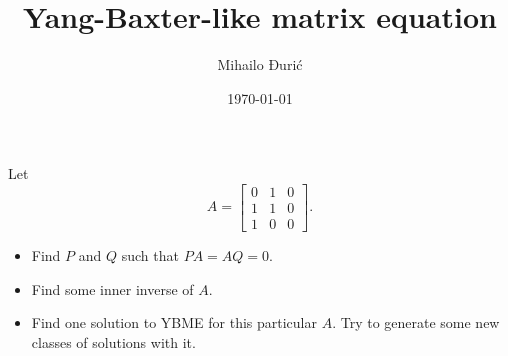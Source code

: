 \documentclass{article}
\title{Yang-Baxter-like matrix equation}
\author{Mihailo Đurić}
\date{\today}
\begin{document}
\maketitle
\newpage

\begin{problem}
  Let
  \[A = \begin{bmatrix} 0 & 1 & 0\\ 1 & 1 & 0\\ 1 & 0 & 0 \end{bmatrix}.\]
  \begin{itemize}
    \item Find $P$ and $Q$ such that $PA = AQ = 0$.
    \item Find some inner inverse of $A$.
    \item Find one solution to YBME for this particular $A$.
      Try to generate some new classes of solutions with it.
  \end{itemize}
\end{problem}
\end{document}
